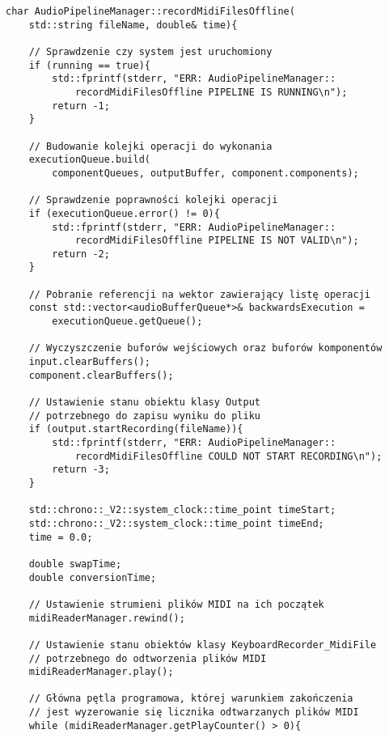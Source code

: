 \begin{lstlisting}
char AudioPipelineManager::recordMidiFilesOffline(
    std::string fileName, double& time){

    // Sprawdzenie czy system jest uruchomiony
    if (running == true){
        std::fprintf(stderr, "ERR: AudioPipelineManager::
            recordMidiFilesOffline PIPELINE IS RUNNING\n");
        return -1;
    }

    // Budowanie kolejki operacji do wykonania
    executionQueue.build(
        componentQueues, outputBuffer, component.components);

    // Sprawdzenie poprawności kolejki operacji
    if (executionQueue.error() != 0){
        std::fprintf(stderr, "ERR: AudioPipelineManager::
            recordMidiFilesOffline PIPELINE IS NOT VALID\n");
        return -2;
    }
    
    // Pobranie referencji na wektor zawierający listę operacji
    const std::vector<audioBufferQueue*>& backwardsExecution = 
        executionQueue.getQueue();

    // Wyczyszczenie buforów wejściowych oraz buforów komponentów
    input.clearBuffers();
    component.clearBuffers();

    // Ustawienie stanu obiektu klasy Output
    // potrzebnego do zapisu wyniku do pliku
    if (output.startRecording(fileName)){
        std::fprintf(stderr, "ERR: AudioPipelineManager::
            recordMidiFilesOffline COULD NOT START RECORDING\n");
        return -3;
    }

    std::chrono::_V2::system_clock::time_point timeStart;
    std::chrono::_V2::system_clock::time_point timeEnd;
    time = 0.0;

    double swapTime;
    double conversionTime;

    // Ustawienie strumieni plików MIDI na ich początek
    midiReaderManager.rewind();

    // Ustawienie stanu obiektów klasy KeyboardRecorder_MidiFile
    // potrzebnego do odtworzenia plików MIDI
    midiReaderManager.play();

    // Główna pętla programowa, której warunkiem zakończenia
    // jest wyzerowanie się licznika odtwarzanych plików MIDI
    while (midiReaderManager.getPlayCounter() > 0){


\end{lstlisting}
